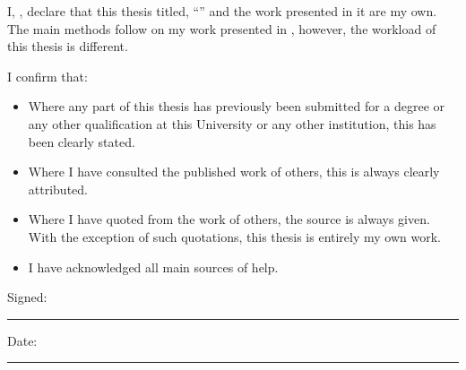 
\begin{declaration}

\noindent I, \authorname, declare that this thesis titled, \enquote{\ttitle} and the work presented in it are my own. The main methods follow on my work presented in \citep{bulin_2016}, however, the workload of this thesis is different.

I confirm that:

\begin{itemize} 
\item Where any part of this thesis has previously been submitted for a degree or any other qualification at this University or any other institution, this has been clearly stated.
\item Where I have consulted the published work of others, this is always clearly attributed.
\item Where I have quoted from the work of others, the source is always given. With the exception of such quotations, this thesis is entirely my own work.
\item I have acknowledged all main sources of help.
\end{itemize}
 
\noindent Signed:\\
\rule[0.5em]{25em}{0.5pt} %
 
\noindent Date:\\
\rule[0.5em]{25em}{0.5pt} %
\end{declaration}

\cleardoublepage